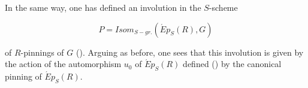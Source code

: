 In the same way, one has defined an involution in the \(S\)-scheme

\[ P = Isom_{S-gr.}(\acute{E}p_{S}(R), G) \]

of \(R\)-pinnings of \(G\) (). Arguing as before, one sees that this involution is given by the action of the
automorphism \(u_{0}\) of \(\acute{E}p_{S}(R)\) defined () by the canonical pinning of \(\acute{E}p_{S}(R)\).
